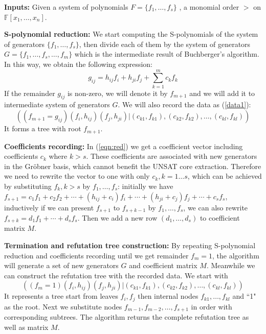 {\bf Inputs:} Given a system of polynomials $F=\{f_1,\ldots,f_s\}$
, a monomial order $>$ on $\mathbb{F}[x_1,\ldots,x_n]$. 

{\bf S-polynomial reduction:} We start computing the S-polynomials of the system of
generators $\{f_1,\ldots,f_s\}$, then divide each of them by the system of
generators $G=\{f_1,\dots,f_s,\dots,f_m\}$ which is the intermediate result of Buchberger's algorithm. 
In this way, we obtain the following expression:
\begin{equation}
\label{eqn:red}
g_{ij}= h_{ij}f_{i}+h_{ji}f_{j}+\displaystyle\sum_{k=1}^m c_kf_k
\end{equation}
If the remainder $g_{ij}$ is non-zero, we will denote it by
$f_{m+1}$ and we will add it to intermediate system of generators $G$. We
will also record the data as (\ref{data1}): 
\begin{displaymath}
((f_{m+1}=g_{ij})(f_{i},h_{ij})(f_{j},h_{ji})| (c_{k1},f_{k1}),(c_{k2},f_{k2}),\dots,(c_{kl},f_{kl}))
\end{displaymath}
It forms a tree with root $f_{m+1}$.

{\bf Coefficients recording:} In (\ref{eqn:red}) we get a coefficient vector including coefficients
$c_k$ where $k>s$. These coefficients are associated with new generators in the Gr\"obner basis,
which cannot benefit the UNSAT core extraction. Therefore we need to rewrite the vector to
one with only $c_k, k=1\dots s$, which can be achieved by substituting $f_k,k>s$ by $f_1,\dots,f_s$:
initially we have $f_{s+1}= c_1f_1 + c_2f_2 + \cdots + (h_{ij}+c_i)f_{i}+\cdots+(h_{ji}+c_j)f_{j}+\cdots+c_sf_s$,
inductively if we can present $f_{s+1}$ to $f_{s+k-1}$ by $f_1,\dots,f_s$, we can also rewrite
$f_{s+k} = d_1f_1+\cdots+d_sf_s$. Then we add a new row $ (d_1,\dots,d_s ) $ to coefficient matrix $M$.

{\bf Termination and refutation tree construction:} By repeating S-polynomial reduction and coefficients 
recording until we get remainder $f_m = 1$, the algorithm
will generate a set of new generators $G$ and coefficient matrix $M$.
Meanwhile we can construct the refutation tree with the recorded data.
We start with 
\begin{displaymath}
((f_{m}=1)(f_{i},h_{ij})(f_{j},h_{ji})| (c_{k1},f_{k1}),(c_{k2},f_{k2}),\dots,(c_{kl},f_{kl}))
\end{displaymath}
It represents a tree start from leaves $f_{i}, f_j$ then internal nodes $f_{k1},\dots,f_{kl}$
and ``1" as the root. Next we substitute nodes $f_{m-1}, f_{m-2}, \dots, f_{s+1}$ in order
with corresponding subtrees. The algorithm returns the complete refutation tree as well as
matrix $M$.

